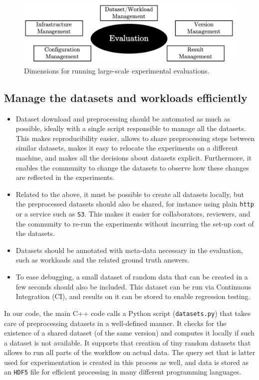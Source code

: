 \documentclass{llncs}
\begin{document}
\begin{figure}[t!]
  \includegraphics[width=\textwidth]{figs/discussion_points.png}
  \caption{Dimensions for running large-scale experimental evaluations.}
  \label{fig:discussion}
\end{figure}

\subsection{Manage the datasets and workloads efficiently}

\begin{itemize}
\item Dataset download and preprocessing should be automated as much as possible,
  ideally with a single script responsible to manage all the datasets.
  This makes reproducibility easier, allows to share preprocessing steps between similar datasets,
  makes it easy to relocate the experiments on a different machine, and makes all the
  decisions about datasets explicit.
  Furthermore, it enables the community to change the datasets to observe how these changes
  are reflected in the experiments.
\item Related to the above, it must be possible to create all datasets locally, 
  but the preprocessed datasets should also be shared, for instance using plain 
  \texttt{http} or a service such as \texttt{S3}.
  This makes it easier for collaborators, reviewers, and the community to re-run the
  experiments without incurring the set-up cost of the datasets.
\item Datasets should be annotated with meta-data necessary in the evaluation, 
  such as workloads and the related ground truth answers.
\item To ease debugging, a small dataset of random data that can be created in a few
  seconds should also be included. This dataset can be run via Continuous Integration (CI), and results on it can be stored to enable regression testing. 
\end{itemize}
%
In our code, the main C++ code calls a Python script ({\tt datasets.py}) that takes care of preprocessing datasets in a well-defined manner. It checks for the existence of a shared dataset (of the same version) and computes it locally if such a dataset is not available. It supports that creation of tiny random datasets that allows to run all parts of the workflow on actual data. The query set that is latter used for experimentation is created in this process as well, and data is stored as an {\tt HDF5} file for efficient processing in many different programming languages.
\end{document}

